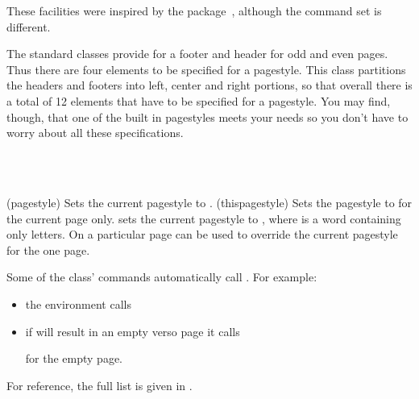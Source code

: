     These facilities were inspired by the  
package~\cite{FANCYHDR}, although the command set is different.

    The standard classes provide for a footer and 
header for odd and even 
pages. Thus there are four elements to be specified for a pagestyle.
This class partitions the headers and footers 
into left, center and right
portions, so that overall there is a total of 12 elements that have 
to be specified
for a pagestyle. You may find, though, that one of the built in pagestyles
meets your needs so you don't have to worry about all these specifications.

\begin{syntax}
\cmd{\pagestyle} \\
\cmd{\thispagestyle} \\
\end{syntax}
\glossary(pagestyle)%
  {}%
  {Sets the current pagestyle to .}
\glossary(thispagestyle)%
  {}%
  {Sets the pagestyle to  for the current page only.}
   \cmd{\pagestyle} sets the current pagestyle to , where
 is a word containing only letters. On a particular
page \cmd{\thispagestyle} can be used to override the current pagestyle for
the one page.

    Some of the class' commands automatically call \cmd{\thispagestyle}.
For example:
\begin{itemize}
\item the  environment calls 
      \begin{lcode}
\thispagestyle{titlingpagestyle}
      \end{lcode} 
\item if \cmd{\cleardoublepage} will result in an empty verso page it calls
      \begin{lcode}
\thispagestyle{cleared}
      \end{lcode}
      for the empty page.
\end{itemize}
For reference, the full list is given in .

